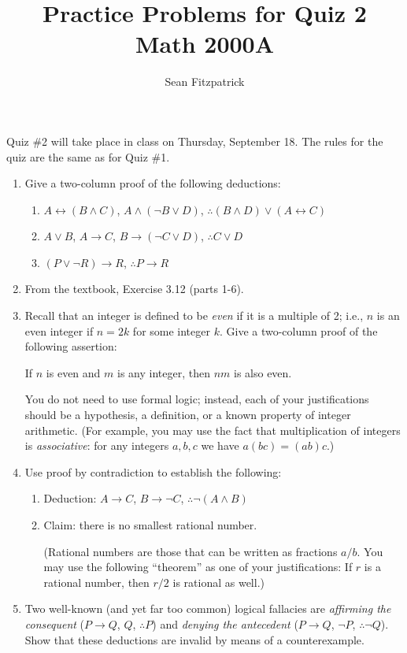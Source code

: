 \documentclass[letterpaper,12pt]{article}
\title{Practice Problems for Quiz 2\\Math 2000A}
\author{Sean Fitzpatrick}
\begin{document}
 \maketitle

Quiz \#2 will take place in class on Thursday, September 18. The rules for the quiz are the same as for Quiz \#1.

\begin{enumerate}
 \item Give a two-column proof of the following deductions:
 \begin{enumerate}
  \item $A\leftrightarrow (B\wedge C)$, $A\wedge (\neg B\vee D)$, $\therefore (B\wedge D)\vee (A\leftrightarrow C)$
  \item $A\vee B$, $A\to C$, $B\to (\neg C\vee D)$, $\therefore C\vee D$
  \item $(P\vee \neg R)\to R$, $\therefore P\to R$
 \end{enumerate}
 \item From the textbook, Exercise 3.12 (parts 1-6).
 \item Recall that an integer is defined to be {\em even} if it is a multiple of 2; i.e., $n$ is an even integer if $n=2k$ for some integer $k$. Give a two-column proof of the following assertion: 
 
 If $n$ is even and $m$ is any integer, then $nm$ is also even. 

You do not need to use formal logic; instead, each of your justifications should be a hypothesis, a definition, or a known property of integer arithmetic. (For example, you may use the fact that multiplication of integers is {\em associative}: for any integers $a,b,c$ we have $a(bc)=(ab)c$.)
  \item Use proof by contradiction to establish the following:
 \begin{enumerate}
  \item Deduction: $A\to C$, $B\to \neg C$, $\therefore \neg (A\wedge B)$
  \item Claim: there is no smallest rational number. 
  
  (Rational numbers are those that can be written as fractions $a/b$. You may use the following ``theorem'' as one of your justifications: If $r$ is a rational number, then $r/2$ is rational as well.)
 \end{enumerate} 
 \item Two well-known (and yet far too common) logical fallacies are {\em affirming the consequent} ($P\to Q$, $Q$, $\therefore P$) and {\em denying the antecedent} ($P\to Q$, $\neg P$, $\therefore \neg Q$). Show that these deductions are invalid by means of a counterexample.

\end{enumerate}
\end{document}
